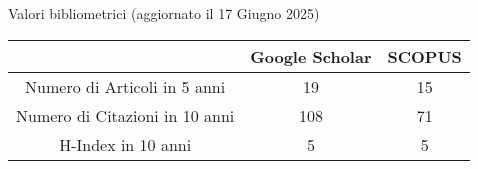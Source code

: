 \documentclass{resume} %
\begin{document}
\begin{rSection}{Valori bibliometrici \tiny{(aggiornato il  17 Giugno 2025)}}
\begin{center}
	
\begin{tabular}{ccc}

 & Google Scholar & SCOPUS \\ \hline
\multicolumn{1}{c}{Numero di Articoli in 5 anni} & 19 & 15 \\ \hline
\multicolumn{1}{c}{Numero di Citazioni in 10 anni} & 108 & 71 \\ \hline
\multicolumn{1}{c}{H-Index in 10 anni} & 5 & 5 \\ 
\end{tabular}%
\end{center}
\end{rSection}
%
%
% 
\end{document}
